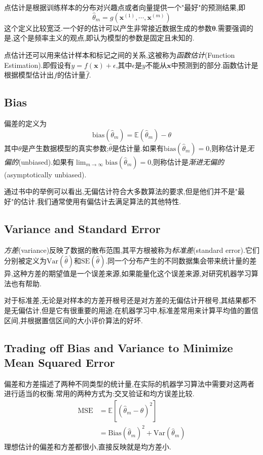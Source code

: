 点估计是根据训练样本的分布对兴趣点或者向量提供一个"最好"的预测结果,即
\begin{equation}
\hat\theta_m=g(\mathbf x^{(1)},\cdots,\mathbf x^{(m)})
\end{equation}
这个定义比较宽泛.一个好的估计可以产生非常接近数据生成的参数$\mathbf\theta$.需要强调的是,这个是频率主义的观点,即认为模型的参数是固定且未知的.

点估计还可以用来估计样本和标记之间的关系,这被称为\textit{函数估计}(Function Estimation).即假设有$y=f(\mathbf x)+\epsilon$,其中$\epsilon$是$y$不能从$\mathbf x$中预测到的部分.函数估计是根据模型估计出$f$的估计量$\hat f$.

\subsection{Bias}

偏差的定义为
\begin{equation}
\text{bias}(\hat\theta_m)=\mathbb E(\hat\theta_m)-\theta
\end{equation}
其中$\theta$是产生数据模型的真实参数;$\hat\theta$是估计量.如果有$\text{bias}(\hat\theta_m)=0$,则称估计是\textit{无偏的}(unbiased).如果有$\lim_{m\to\infty}\text{bias}(\hat\theta_m)=0$,则称估计是\textit{渐进无偏的}(asymptotically unbiased).

通过书中的举例可以看出,无偏估计符合大多数算法的要求,但是他们并不是"最好"的估计.我们通常使用有偏估计去满足算法的其他特性.

\subsection{Variance and Standard Error}

\textit{方差}(variance)反映了数据的散布范围,其平方根被称为\textit{标准差}(standard error).它们分别被定义为$\text{Var}(\hat\theta)$和$\text{SE}(\hat\theta)$.同一个分布产生的不同数据集会带来统计量的差异,这种方差的期望值是一个误差来源,如果能量化这个误差来源,对研究机器学习算法也有帮助.

对于标准差,无论是对样本的方差开根号还是对方差的无偏估计开根号,其结果都不是无偏估计,但是它有很重要的用途.在机器学习中,标准差常用来计算平均值的置信区间,并根据置信区间的大小评价算法的好坏.

\subsection{Trading off Bias and Variance to Minimize Mean Squared Error}

偏差和方差描述了两种不同类型的统计量,在实际的机器学习算法中需要对这两者进行适当的权衡.常用的两种方式为:交叉验证和均方误差比较.
\begin{equation}\begin{split}
\text{MSE}&=\mathbb E[(\hat\theta_m-\theta)^2]\\
&=\text{Bias}(\hat\theta_m)^2+\text{Var}(\hat\theta_m)
\end{split}\end{equation}
理想估计的偏差和方差都很小,直接反映就是均方差小.

